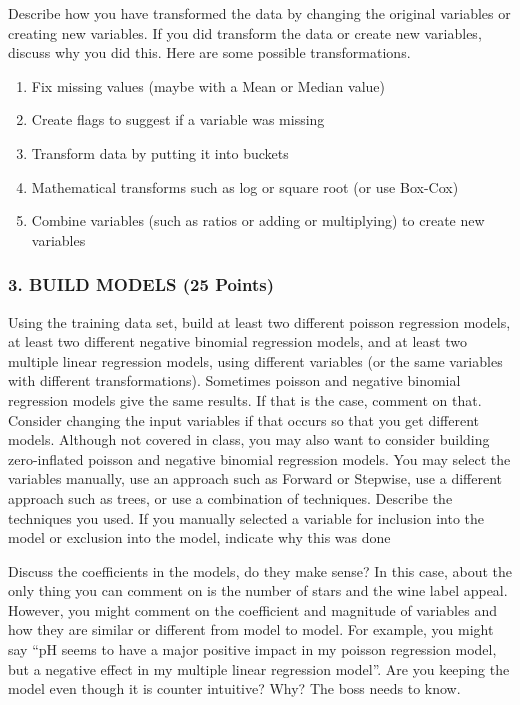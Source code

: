 \documentclass[
]{article}
\providecommand{\tightlist}{%
  \setlength{\itemsep}{0pt}\setlength{\parskip}{0pt}}
\begin{document}
Describe how you have transformed the data by changing the original
variables or creating new variables. If you did transform the data or
create new variables, discuss why you did this. Here are some possible
transformations.

\begin{enumerate}
\def\labelenumi{\alph{enumi}.}
\tightlist
\item
  Fix missing values (maybe with a Mean or Median value)
\item
  Create flags to suggest if a variable was missing
\item
  Transform data by putting it into buckets
\item
  Mathematical transforms such as log or square root (or use Box-Cox)
\item
  Combine variables (such as ratios or adding or multiplying) to create
  new variables
\end{enumerate}

\hypertarget{build-models-25-points}{%
\subsubsection{3. BUILD MODELS (25
Points)}\label{build-models-25-points}}

Using the training data set, build at least two different poisson
regression models, at least two different negative binomial regression
models, and at least two multiple linear regression models, using
different variables (or the same variables with different
transformations). Sometimes poisson and negative binomial regression
models give the same results. If that is the case, comment on that.
Consider changing the input variables if that occurs so that you get
different models. Although not covered in class, you may also want to
consider building zero-inflated poisson and negative binomial regression
models. You may select the variables manually, use an approach such as
Forward or Stepwise, use a different approach such as trees, or use a
combination of techniques. Describe the techniques you used. If you
manually selected a variable for inclusion into the model or exclusion
into the model, indicate why this was done

Discuss the coefficients in the models, do they make sense? In this
case, about the only thing you can comment on is the number of stars and
the wine label appeal. However, you might comment on the coefficient and
magnitude of variables and how they are similar or different from model
to model. For example, you might say ``pH seems to have a major positive
impact in my poisson regression model, but a negative effect in my
multiple linear regression model''. Are you keeping the model even
though it is counter intuitive? Why? The boss needs to know.
\end{document}
